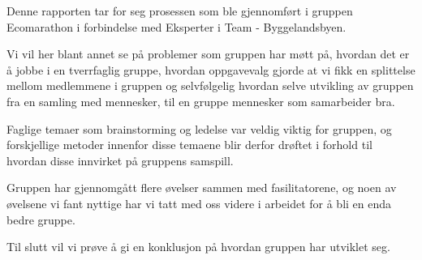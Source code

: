 Denne rapporten tar for seg prosessen som ble gjennomført i gruppen Ecomarathon i forbindelse med Eksperter i Team - Byggelandsbyen.

Vi vil her blant annet se på problemer som gruppen har møtt på, hvordan det er å jobbe i en tverrfaglig gruppe, hvordan oppgavevalg gjorde at vi fikk en splittelse mellom medlemmene i gruppen og selvfølgelig hvordan selve utvikling av gruppen fra en samling med mennesker, til en gruppe mennesker som samarbeider bra.

Faglige temaer som brainstorming og ledelse var veldig viktig for gruppen, og forskjellige metoder innenfor disse temaene blir derfor drøftet i forhold til hvordan disse innvirket på gruppens samspill.

Gruppen har gjennomgått flere øvelser sammen med fasilitatorene, og noen av øvelsene vi fant nyttige har vi tatt med oss videre i arbeidet for å bli en enda bedre gruppe.

Til slutt vil vi prøve å gi en konklusjon på hvordan gruppen har utviklet seg. 
